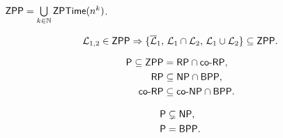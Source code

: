 		\begin{defn}
			$\mathsf{ZPP} = \bigcup\limits_{k\in\mathbb{N}} \mathsf{ZPTime}(n^k)$.
		\end{defn}
		
		\begin{thm}
			\begin{equation*}
				{\cal L}_{1,2}\in\mathsf{ZPP} \Rightarrow \{ {\cal\overline L}_1,\,{\cal L}_1\cap{\cal L}_2,\,{\cal L}_1\cup{\cal L}_2\} \subseteq \mathsf{ZPP} .
			\end{equation*}
		\end{thm}
		
		\begin{thm}
			\begin{align*}
				\mathsf{P} \subseteq \mathsf{ZPP} &= \mathsf{RP} \cap \mathsf{co}\textnormal{-}\mathsf{RP} , \\
				\mathsf{RP} &\subseteq \mathsf{NP}\cap\mathsf{BPP} , \\
				\mathsf{co}\textnormal{-}\mathsf{RP} &\subseteq \mathsf{co}\textnormal{-}\mathsf{NP}\cap\mathsf{BPP} .
			\end{align*}
		\end{thm}
		
		\begin{conj}
			\begin{align*}
				\mathsf{P} &\subsetneq \mathsf{NP}, \\
				\mathsf{P} &= \mathsf{BPP}.
			\end{align*}
		\end{conj}
		
		

